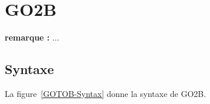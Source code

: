 \documentclass[11pt]{article}
\newcommand{\REMARQUE}[1]{{\color{blue}\textbf{remarque :} #1}}
\newcommand{\sor}{
  \mathrel{\makebox[\widthof{$\Coloneqq$}]{$|$}}%
}
\begin{document}
\section{\textsf{GO2B}}


\REMARQUE{...}
\newcommand{\BNFsection}[1]{&&&\textbf{#1}}
\newcommand{\BNFeqq}[3]{#1&\Coloneqq#2&&\text{#3}}
\newcommand{\BNFcase}[2]{&\sor#1&&\text{#2}}

\subsection{Syntaxe}
La figure~\ref{GOTOB-Syntax} donne la syntaxe de \textsf{GO2B}.
\end{document}
